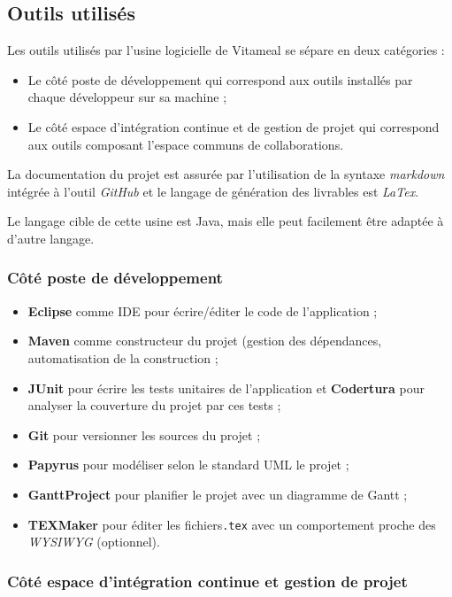 \subsection{Outils utilisés}

Les outils utilisés par l'usine logicielle de Vitameal se sépare en deux catégories :

\begin{itemize}
	\item Le côté poste de développement qui correspond aux outils installés par chaque développeur sur sa machine ;
	\item Le côté espace d'intégration continue et de gestion de projet qui correspond aux outils composant l'espace communs de collaborations.
\end{itemize}

La documentation du projet est assurée par l'utilisation de la syntaxe \emph{markdown} intégrée à l'outil \emph{GitHub} et le langage de génération des livrables est \emph{LaTex}.

Le langage cible de cette usine est Java, mais elle peut facilement être adaptée à d'autre langage.

\subsubsection{Côté poste de développement}

\begin{itemize}
	\item \textbf{Eclipse} comme IDE pour écrire/éditer le code de l'application ;
	\item \textbf{Maven} comme constructeur du projet (gestion des dépendances, automatisation de la construction ;
	\item \textbf{JUnit} pour écrire les tests unitaires de l'application et \textbf{Codertura} pour analyser la couverture du projet par ces tests ;
	\item \textbf{Git} pour versionner les sources du projet ;
	\item \textbf{Papyrus} pour modéliser selon le standard UML le projet ;
	\item \textbf{GanttProject} pour planifier le projet avec un diagramme de Gantt ;
	\item \textbf{TEXMaker} pour éditer les fichiers\texttt{.tex} avec un comportement proche des \emph{WYSIWYG} (optionnel).
\end{itemize}

\subsubsection{Côté espace d'intégration continue et gestion de projet}

